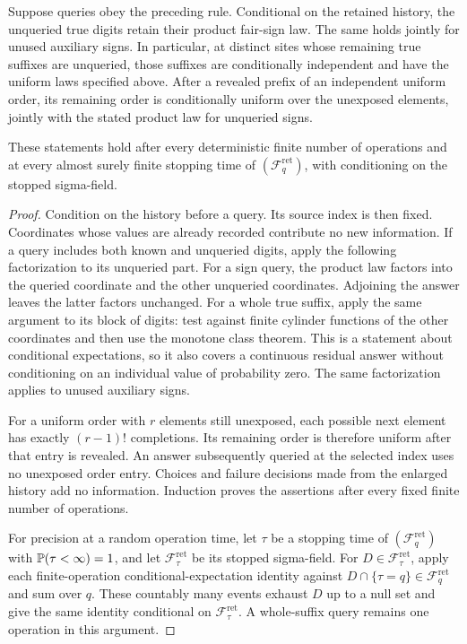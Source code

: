 \begin{lemma}\label{lem:conditional-freshness}
Suppose queries obey the preceding rule. Conditional on the retained
history, the unqueried true digits retain their product fair-sign law.
The same holds jointly for unused auxiliary signs. In particular, at
distinct sites whose remaining true suffixes are unqueried, those suffixes
are conditionally independent and have the uniform laws specified above.
After a revealed prefix of an independent uniform order, its remaining
order is conditionally uniform over the unexposed elements, jointly with
the stated product law for unqueried signs.

These statements hold after every deterministic finite number of
operations and at every almost surely finite stopping time of
$(\mathcal F_q^{\mathrm{ret}})$, with conditioning on the stopped sigma-field.
\end{lemma}

\begin{proof}
Condition on the history before a query. Its source index is then fixed.
Coordinates whose values are already recorded contribute no new
information. If a query includes both known and unqueried digits, apply
the following factorization to its unqueried part.
For a sign query, the product law factors into the queried coordinate and
the other unqueried coordinates. Adjoining the answer leaves the latter
factors unchanged. For a whole true suffix, apply the same argument to
its block of digits: test against finite cylinder functions of the other
coordinates and then use the monotone class theorem. This is a statement
about conditional expectations, so it also covers a continuous residual
answer without conditioning on an individual value of probability zero.
The same factorization applies to unused auxiliary signs.

For a uniform order with $r$ elements still unexposed, each possible
next element has exactly $(r-1)!$ completions. Its remaining order is
therefore uniform after that entry is revealed. An answer subsequently
queried at the selected index uses no unexposed order entry. Choices and
failure decisions made from the enlarged history add no information.
Induction proves the assertions after every fixed finite number of
operations.

For precision at a random operation time, let $\tau$ be a stopping time
of $(\mathcal F_q^{\mathrm{ret}})$ with $\mathbb P(\tau<\infty)=1$, and let $\mathcal F_\tau^{\mathrm{ret}}$
be its stopped sigma-field. For $D\in\mathcal F_\tau^{\mathrm{ret}}$, apply each
finite-operation conditional-expectation identity against
$D\cap\{\tau=q\}\in\mathcal F_q^{\mathrm{ret}}$ and sum over $q$. These countably many
events exhaust $D$ up to a null set and give the same identity conditional
on $\mathcal F_\tau^{\mathrm{ret}}$. A whole-suffix query remains one operation in this
argument.
\end{proof}

